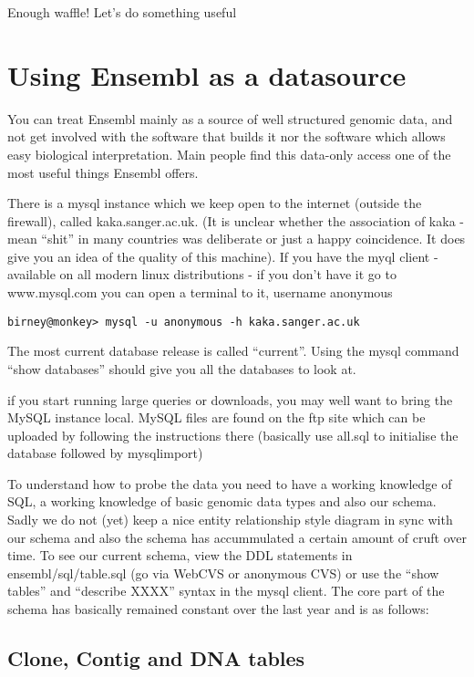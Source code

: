 \documentclass[11pt,a4paper]{article}
\begin{document}
Enough waffle! Let's do something useful

\section{Using Ensembl as a datasource}

You can treat Ensembl mainly as a source of well structured genomic data, and not
get involved with the software that builds it nor the software which allows easy 
biological interpretation. Main people find this data-only access one of the most
useful things Ensembl offers.

There is a mysql instance which we keep open to the internet (outside
the firewall), called kaka.sanger.ac.uk.  (It is unclear whether the
association of kaka - mean ``shit'' in many countries was deliberate
or just a happy coincidence. It does give you an idea of the quality
of this machine). If you have the myql client - available on all modern
linux distributions - if you don't have it go to www.mysql.com you can open
a terminal to it, username anonymous

\begin{verbatim}
birney@monkey> mysql -u anonymous -h kaka.sanger.ac.uk
\end{verbatim}



The most current database release is called ``current''. Using the
mysql command ``show databases'' should give you all the databases to
look at.


if you start running large queries or downloads, you may well want to
bring the MySQL instance local. MySQL files are found on the ftp site
which can be uploaded by following the instructions there (basically
use all.sql to initialise the database followed by mysqlimport)

To understand how to probe the data you need to have a working
knowledge of SQL, a working knowledge of basic genomic data types and
also our schema. Sadly we do not (yet) keep a nice entity relationship
style diagram in sync with our schema and also the schema has
accummulated a certain amount of cruft over time. To see our current
schema, view the DDL statements in ensembl/sql/table.sql (go via
WebCVS or anonymous CVS) or use the ``show tables'' and ``describe
XXXX'' syntax in the mysql client. The core part of the schema has
basically remained constant over the last year and is as follows:

\subsection{Clone, Contig and DNA tables}
\end{document}
